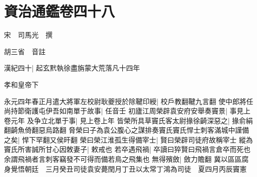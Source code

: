 \section{資治通鑑卷四十八}
宋　司馬光　撰

胡三省　音註

漢紀四十|{
	起玄黓執徐盡旃蒙大荒落凡十四年}


孝和皇帝下

永元四年春正月遣大將軍左校尉耿夔授於除鞬印綬|{
	校戶教翻鞬九言翻}
使中郎將任尚持節衛護屯伊吾如南單于故事|{
	任音壬}
初廬江周榮辟袁安府安舉奏竇景|{
	事見上卷元年}
及争立北單于事|{
	見上卷上年}
皆榮所具草竇氏客太尉掾徐齮深惡之|{
	掾俞絹翻齮魚倚翻惡烏路翻}
脅榮曰子為袁公腹心之謀排奏竇氏竇氏悍士刺客滿城中謹備之矣|{
	悍下罕翻又侯旰翻}
榮曰榮江淮孤生得備宰士|{
	賢曰榮辟司徒府故稱宰士}
縱為竇氏所害誠所甘心因敇妻子|{
	敕戒也}
若卒遇飛禍|{
	卒讀曰猝賢曰飛禍言倉卒而死也余謂飛禍者言刺客竊發不可得而備若鳥之飛集也}
無得殯斂|{
	斂力贍翻}
冀以區區腐身覺悟朝廷　三月癸丑司徒袁安薨閏月丁丑以太常丁鴻為司徒　夏四月丙辰竇憲

